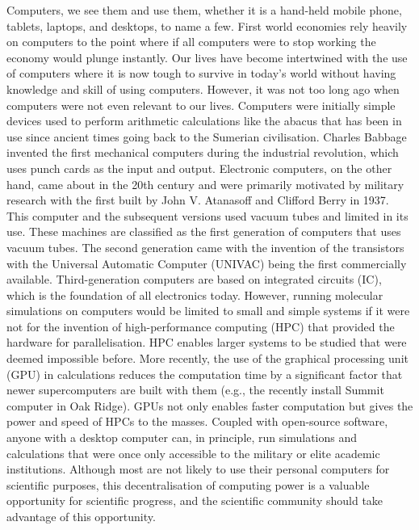 \vskip 0.5cm

Computers, we see them and use them, whether it is a hand-held mobile phone, tablets, laptops, 
and desktops, to name a few. First world economies rely heavily on computers to the point where 
if all computers were to stop working the economy would plunge instantly. Our lives have become 
intertwined with the use of computers where it is now tough to survive in today's world without 
having knowledge and skill of using computers. However, it was not too long ago when computers 
were not even relevant to our lives. Computers were initially simple devices used to perform 
arithmetic calculations like the abacus that has been in use since ancient times going back to 
the Sumerian civilisation. Charles Babbage invented the first mechanical computers during the 
industrial revolution, which uses punch cards as the input and output. Electronic computers, on 
the other hand, came about in the 20th century and were primarily motivated by military research 
with the first built by John V. Atanasoff and Clifford Berry in 1937. This computer and the 
subsequent versions used vacuum tubes and limited in its use. These machines are classified as 
the first generation of computers that uses vacuum tubes. The second generation came with the 
invention of the transistors with the Universal Automatic Computer (UNIVAC) being the first 
commercially available. Third-generation computers are based on integrated circuits (IC), 
which is the foundation of all electronics today. However, running molecular simulations on 
computers would be limited to small and simple systems if it were not for the invention of 
high-performance computing (HPC) that provided the hardware for parallelisation. HPC enables 
larger systems to be studied that were deemed impossible before. More recently, the use of 
the graphical processing unit (GPU) in calculations reduces the computation time by a 
significant factor that newer supercomputers are built with them (e.g., the recently install 
Summit computer in Oak Ridge). GPUs not only enables faster computation but gives the power 
and speed of HPCs to the masses. Coupled with open-source software, anyone with a 
desktop computer can, in principle, run simulations and calculations that were once only 
accessible to the military or elite academic institutions. Although most are not likely to 
use their personal computers for scientific purposes, this decentralisation of computing 
power is a valuable opportunity for scientific progress, and the scientific community should 
take advantage of this opportunity.


